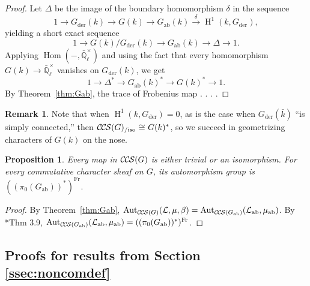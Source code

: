 \documentclass[10pt]{amsart}
\theoremstyle{plain}
\newtheorem{proposition}[theorem]{Proposition}
\theoremstyle{definition}
\newtheorem{remark}[theorem]{Remark}
\newcommand{\EE}{\mathbb{\bar Q}_\ell}
\newcommand{\bFq}{\bar{k}}
\newcommand{\Fq}{k}
\newcommand{\EEx}{\EE^\times}
\newcommand{\Frob}[1]{\operatorname{Fr}_{#1}}
\DeclareMathOperator{\Aut}{Aut}
\DeclareMathOperator{\Hom}{Hom}
\DeclareMathOperator{\Hh}{H}
\newcommand{\der}{_{\operatorname{der}}}
\newcommand{\ab}{_{\operatorname{ab}}}
\newcommand{\iso}{{\ \cong\ }}
\newcommand{\cs}[1]{{\mathcal{#1}}}
\newcommand{\CCS}{{\mathcal{C\hskip-.8pt C\hskip-0.8pt S}}}
\newcommand{\CCSiso}[1]{\CCS(#1)_{/\text{iso}}}
\begin{document}
\begin{proof}
Let $\Delta$ be the image of the boundary homomorphism $\delta$ in the sequence
\[
1 \to G\der(k) \to G(k) \to G\ab(k) \xrightarrow{\delta} \Hh^1(k, G\der),
\]
yielding a short exact sequence
\[
1 \to G(k) / G\der(k) \to G\ab(k) \to \Delta \to 1.
\]
Applying $\Hom(-, \EEx)$ and using the fact that every homomorphism $G(k) \to \EEx$ vanishes on $G\der(k)$, we get
\[
1 \to \Delta^* \to G\ab(k)^* \to G(k)^* \to 1.
\]
By Theorem~\ref{thm:Gab}, the trace of Frobenius map  . . . .
\end{proof}

\begin{remark}
Note that when $\Hh^1(k,G\der) = 0$, as is the case when $G\der(\bFq)$ ``is simply connected,'' then $\CCSiso{G} \iso G(\Fq)^*$, so
we succeed in geometrizing characters of $G(k)$ on the nose.
\end{remark}

\begin{proposition}
Every map in $\CCS(G)$ is either trivial or an isomorphism. 
For every commutative character sheaf on $G$, its automorphism group is
$
((\pi_0(G\ab))^*)^{\Frob{}}.
$
\end{proposition}

\begin{proof}
By Theorem~\ref{thm:Gab}, $\Aut_{\CCS(G)}(\cs{L},\mu,\beta) = \Aut_{\CCS(G\ab)}(\cs{L}\ab,\mu\ab)$. 
By \cite{cunningham-roe:13a}*{Thm 3.9},  $\Aut_{\CCS(G\ab)}(\cs{L}\ab,\mu\ab) = ((\pi_0(G\ab))^*)^{\Frob{}}$.
\end{proof}





\subsection{Proofs for results from Section \ref{ssec:noncomdef}} \label{ssec:proofs}
\end{document}
